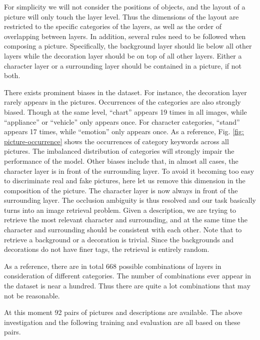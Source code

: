 \documentclass{article} %
\begin{document}
For simplicity we will not consider the positions of objects, and the layout of a picture will only touch the layer level. Thus the dimensions of the layout are restricted to the specific categories of the layers, as well as the order of overlapping between layers. In addition, several rules need to be followed when composing a picture. Specifically, the background layer should lie below all other layers while the decoration layer should be on top of all other layers. Either a character layer or a surrounding layer should be contained in a picture, if not both. 

There exists prominent biases in the dataset. For instance, the decoration layer rarely appears in the pictures. Occurrences of the categories are also strongly biased. Though at the same level, ``chart'' appears 19 times in all images, while ``appliance'' or ``vehicle'' only appears once. For character categories, ``stand'' appears 17 times, while ``emotion'' only appears once. As a reference, Fig. \ref{fig: picture-occurrence} shows the occurrences of category keywords across all pictures. The imbalanced distribution of categories will strongly impair the performance of the model. Other biases include that, in almost all cases, the character layer is in front of the surrounding layer. To avoid it becoming too easy to discriminate real and fake pictures, here let us remove this dimension in the composition of the picture. The character layer is now always in front of the surrounding layer. The occlusion ambiguity is thus resolved and our task basically turns into an image retrieval problem. Given a description, we are trying to retrieve the most relevant character and surrounding, and at the same time the character and surrounding should be consistent with each other. Note that to retrieve a background or a decoration is trivial. Since the backgrounds and decorations do not have finer tags, the retrieval is entirely random.

As a reference, there are in total 668 possible combinations of layers in consideration of different categories. The number of combinations ever appear in the dataset is near a hundred. Thus there are quite a lot combinations that may not be reasonable. 

At this moment 92 pairs of pictures and descriptions are available. The above investigation and the following training and evaluation are all based on these pairs.

%		
\end{document}
